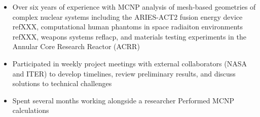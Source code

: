 \documentclass[a4paper,10pt]{article}
\begin{document}
\begin{itemize}[leftmargin=.9in,rightmargin=.875in,itemsep=1.6mm]

                \item Over six years of experience with MCNP analysis of
			mesh-based geometries of complex nuclear
	              systems including the ARIES-ACT2 fusion energy device refXXX,
		      computational human phantoms in space radiaiton environments
		      refXXX, weapons systems reflacp, and materials testing
		      experiments in the
		      Annular Core Research Reactor (ACRR)
                \item Participated in weekly project meetings with external collaborators (NASA and
	              ITER) to develop timelines, review preliminary results, and discuss
		      solutions to technical challenges
		\item Spent several months working alongside a researcher
			Performed MCNP calculations

\end{itemize}
\end{document}
